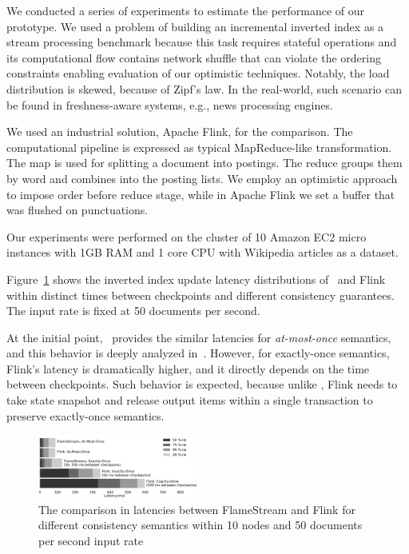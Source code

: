 \label {fs-short-experiments}

We conducted a series of experiments to estimate the performance of our prototype. We used a problem of building an incremental inverted index as a stream processing benchmark because this task requires stateful operations and its computational flow contains network shuffle that can violate the ordering constraints enabling evaluation of our optimistic techniques. Notably, the load distribution is skewed, because of Zipf's law. In the real-world, such scenario can be found in freshness-aware systems, e.g., news processing engines.

We used an industrial solution, Apache Flink, for the comparison. The computational pipeline is expressed as typical MapReduce-like transformation. The map is used for splitting a document into postings. The reduce groups them by word and combines into the posting lists. We employ an optimistic approach to impose order before reduce stage, while in Apache Flink we set a buffer that was flushed on punctuations.

Our experiments were performed on the cluster of 10 Amazon EC2 micro instances with 1GB RAM and 1 core CPU with Wikipedia articles as a dataset.

Figure~\ref{performance} shows the inverted index update latency distributions of \FlameStream\ and Flink within distinct times between checkpoints and different consistency guarantees. The input rate is fixed at 50 documents per second.

At the initial point, \FlameStream\ provides the similar latencies for {\em at-most-once} semantics, and this behavior is deeply analyzed in~\cite{we2018seim}. However, for exactly-once semantics, Flink's latency is dramatically higher, and it directly depends on the time between checkpoints. Such behavior is expected, because unlike \FlameStream, Flink needs to take state snapshot and release output items within a single transaction to preserve exactly-once semantics.

\begin{figure}[htbp]
  \centering
  \includegraphics[width=0.47\textwidth]{pics/comparison}
  \caption{The comparison in latencies between FlameStream and Flink for different consistency semantics within 10 nodes and 50 documents per second input rate}
  \label {performance}
\end{figure}
